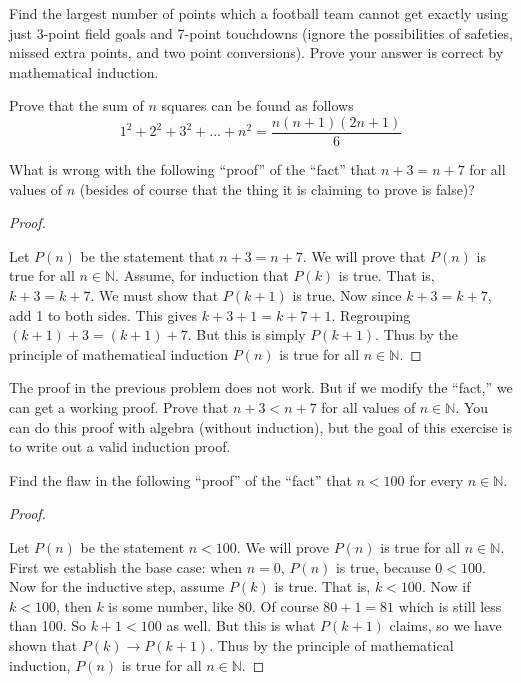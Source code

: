 \documentclass[10pt,]{book}
\theoremstyle{plain}
\theoremstyle{definition}
\theoremstyle{definition}
\theoremstyle{definition}
\theoremstyle{definition}
\numberwithin{equation}{chapter}
\def\N{\mathbb N}
\def\imp{\rightarrow}
\newcommand{\lt}{<}
\begin{document}
\begin{divisionexercise}{8}\hypertarget{exercise-263}{}
\hypertarget{p-2284}{}%
Find the largest number of points which a football team cannot get exactly using just 3-point field goals and 7-point touchdowns (ignore the possibilities of safeties, missed extra points, and two point conversions). Prove your answer is correct by mathematical induction.%
\end{divisionexercise}%
\begin{divisionexercise}{9}\hypertarget{exercise-264}{}
\hypertarget{p-2291}{}%
Prove that the sum of \(n\) squares can be found as follows%
\begin{equation*}
1^2 +2^2 +3^2+...+n^2 = \frac{n(n+1)(2n+1)}{6}
\end{equation*}
%
\end{divisionexercise}%
\begin{divisionexercise}{10}\hypertarget{exercise-265}{}
\hypertarget{p-2299}{}%
What is wrong with the following ``proof'' of the ``fact'' that \(n+3 = n+7\) for all values of \(n\) (besides of course that the thing it is claiming to prove is false)?%
\begin{proof}\hypertarget{proof-49}{}
\hypertarget{p-2300}{}%
Let \(P(n)\) be the statement that \(n + 3 = n + 7\). We will prove that \(P(n)\) is true for all \(n \in \N\). Assume, for induction that \(P(k)\) is true. That is, \(k+3 = k+7\). We must show that \(P(k+1)\) is true. Now since \(k + 3 = k + 7\), add 1 to both sides. This gives \(k + 3 + 1 = k + 7 + 1\). Regrouping \((k+1) + 3 = (k+1) + 7\). But this is simply \(P(k+1)\). Thus by the principle of mathematical induction \(P(n)\) is true for all \(n \in \N\).%
\end{proof}
\end{divisionexercise}%
\begin{divisionexercise}{11}\hypertarget{exercise-266}{}
\hypertarget{p-2302}{}%
The proof in the previous problem does not work. But if we modify the ``fact,'' we can get a working proof. Prove that \(n + 3 \lt  n + 7\) for all values of \(n \in \N\). You can do this proof with algebra (without induction), but the goal of this exercise is to write out a valid induction proof.%
\end{divisionexercise}%
\begin{divisionexercise}{12}\hypertarget{exercise-267}{}
\hypertarget{p-2304}{}%
Find the flaw in the following ``proof'' of the ``fact'' that \(n \lt  100\) for every \(n \in \N\).%
\begin{proof}\hypertarget{proof-51}{}
\hypertarget{p-2305}{}%
Let \(P(n)\) be the statement \(n \lt  100\). We will prove \(P(n)\) is true for all \(n \in \N\). First we establish the base case: when \(n = 0\), \(P(n)\) is true, because \(0 \lt  100\). Now for the inductive step, assume \(P(k)\) is true. That is, \(k \lt  100\). Now if \(k \lt  100\), then \(k\) is some number, like 80. Of course \(80+1 = 81\) which is still less than 100. So \(k +1 \lt  100\) as well. But this is what \(P(k+1)\) claims, so we have shown that \(P(k) \imp P(k+1)\). Thus by the principle of mathematical induction, \(P(n)\) is true for all \(n \in \N\).%
\end{proof}
\end{divisionexercise}%
\end{document}
